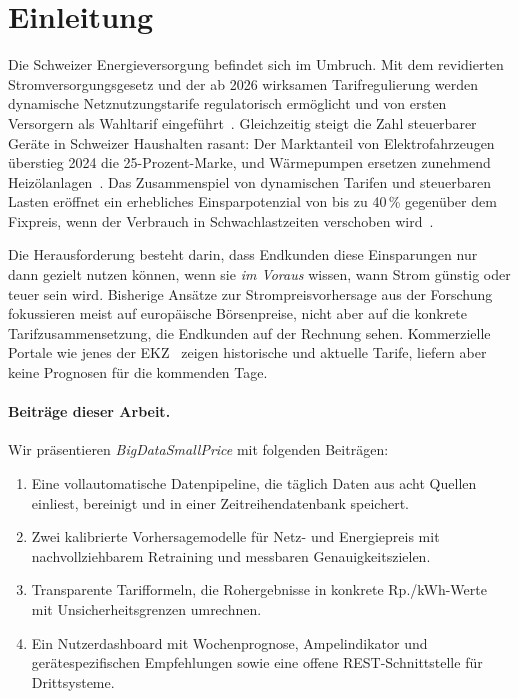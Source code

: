 \documentclass[sigconf]{acmart}
\begin{document}
\section{Einleitung}

Die Schweizer Energieversorgung befindet sich im Umbruch.
Mit dem revidierten Stromversorgungsgesetz und der ab 2026 wirksamen
Tarifregulierung werden dynamische Netznutzungstarife regulatorisch
erm\"oglicht und von ersten Versorgern als Wahltarif eingef\"uhrt~\cite{ElCom2023,EKZ2024}.
Gleichzeitig steigt die Zahl steuerbarer Ger\"ate in Schweizer Haushalten rasant:
Der Marktanteil von Elektrofahrzeugen \"uberstieg 2024 die 25-Prozent-Marke,
und W\"armepumpen ersetzen zunehmend Heiz\-\"ol\-anlagen~\cite{ASTRA2024}.
Das Zusammenspiel von dynamischen Tarifen und steuerbaren Lasten er\"offnet
ein erhebliches Einsparpotenzial von bis zu 40\,\% gegen\"uber dem Fixpreis,
wenn der Verbrauch in Schwachlastzeiten verschoben wird~\cite{EKZ2024}.

Die Herausforderung besteht darin, dass Endkunden diese Einsparungen nur dann
gezielt nutzen k\"onnen, wenn sie \emph{im Voraus} wissen, wann Strom g\"unstig
oder teuer sein wird.
Bisherige Ans\"atze zur Strompreisvorhersage aus der Forschung~\cite{Lago2021,
Weron2014} fokussieren meist auf europ\"aische B\"orsenpreise, nicht aber auf
die konkrete Tarifzusammensetzung, die Endkunden auf der Rechnung sehen.
Kommerzielle Portale wie jenes der EKZ~\cite{EKZ2024} zeigen historische und
aktuelle Tarife, liefern aber keine Prognosen f\"ur die kommenden Tage.

\paragraph{Beitr\"age dieser Arbeit.}
Wir pr\"asentieren \emph{BigDataSmallPrice} mit folgenden Beitr\"agen:
\begin{enumerate}
  \item Eine vollautomatische Datenpipeline, die t\"aglich Daten aus acht Quellen
        einliest, bereinigt und in einer Zeitreihendatenbank speichert.
  \item Zwei kalibrierte Vorhersagemodelle f\"ur Netz- und Energiepreis mit
        nachvollziehbarem Retraining und messbaren Genauigkeitszielen.
  \item Transparente Tarifformeln, die Rohergebnisse in konkrete Rp./kWh-Werte
        mit Unsicherheitsgrenzen umrechnen.
  \item Ein Nutzerdashboard mit Wochenprognose, Ampelindikator und ger\"atespezifischen
        Empfehlungen sowie eine offene REST-Schnittstelle f\"ur Drittsysteme.
\end{enumerate}
\end{document}
